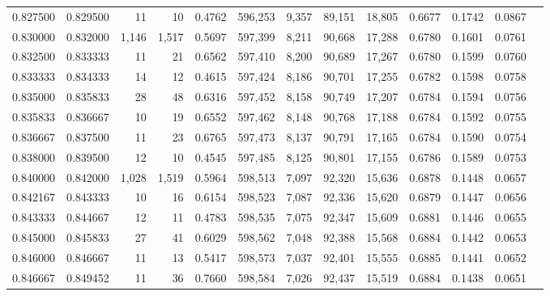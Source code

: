 \begin{tabular}{rrrrrrrrrrrrr}
0.827500 & 0.829500 &     11 &    10 &                                     0.4762 & 596,253 &   9,357 &  89,151 &  18,805 & 0.6677 & 0.1742 & 0.0867 \\
0.830000 & 0.832000 &  1,146 & 1,517 &                                     0.5697 & 597,399 &   8,211 &  90,668 &  17,288 & 0.6780 & 0.1601 & 0.0761 \\
0.832500 & 0.833333 &     11 &    21 &                                     0.6562 & 597,410 &   8,200 &  90,689 &  17,267 & 0.6780 & 0.1599 & 0.0760 \\
0.833333 & 0.834333 &     14 &    12 &                                     0.4615 & 597,424 &   8,186 &  90,701 &  17,255 & 0.6782 & 0.1598 & 0.0758 \\
0.835000 & 0.835833 &     28 &    48 &                                     0.6316 & 597,452 &   8,158 &  90,749 &  17,207 & 0.6784 & 0.1594 & 0.0756 \\
0.835833 & 0.836667 &     10 &    19 &                                     0.6552 & 597,462 &   8,148 &  90,768 &  17,188 & 0.6784 & 0.1592 & 0.0755 \\
0.836667 & 0.837500 &     11 &    23 &                                     0.6765 & 597,473 &   8,137 &  90,791 &  17,165 & 0.6784 & 0.1590 & 0.0754 \\
0.838000 & 0.839500 &     12 &    10 &                                     0.4545 & 597,485 &   8,125 &  90,801 &  17,155 & 0.6786 & 0.1589 & 0.0753 \\
0.840000 & 0.842000 &  1,028 & 1,519 &                                     0.5964 & 598,513 &   7,097 &  92,320 &  15,636 & 0.6878 & 0.1448 & 0.0657 \\
0.842167 & 0.843333 &     10 &    16 &                                     0.6154 & 598,523 &   7,087 &  92,336 &  15,620 & 0.6879 & 0.1447 & 0.0656 \\
0.843333 & 0.844667 &     12 &    11 &                                     0.4783 & 598,535 &   7,075 &  92,347 &  15,609 & 0.6881 & 0.1446 & 0.0655 \\
0.845000 & 0.845833 &     27 &    41 &                                     0.6029 & 598,562 &   7,048 &  92,388 &  15,568 & 0.6884 & 0.1442 & 0.0653 \\
0.846000 & 0.846667 &     11 &    13 &                                     0.5417 & 598,573 &   7,037 &  92,401 &  15,555 & 0.6885 & 0.1441 & 0.0652 \\
0.846667 & 0.849452 &     11 &    36 &                                     0.7660 & 598,584 &   7,026 &  92,437 &  15,519 & 0.6884 & 0.1438 & 0.0651 \\

\end{tabular}

